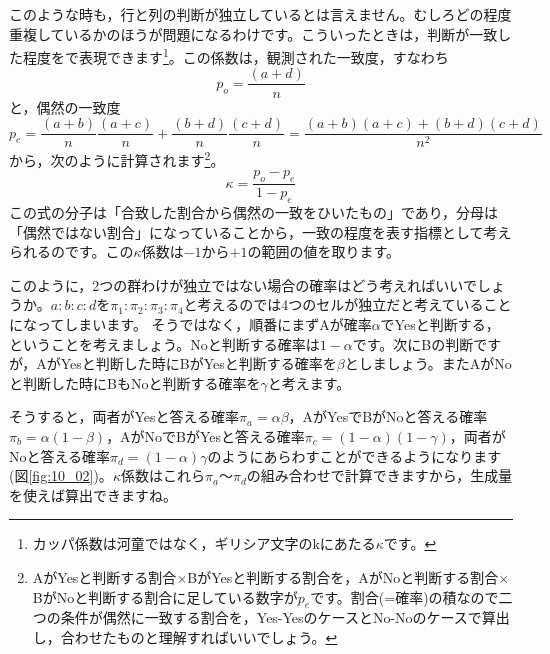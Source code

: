 \documentclass{ltjsbook}
\begin{document}
このような時も，行と列の判断が独立しているとは言えません。むしろどの程度重複しているかのほうが問題になるわけです。こういったときは，判断が一致した程度をで表現できます\footnote{カッパ係数は河童ではなく，ギリシア文字のkにあたる$\kappa$です。}。この係数は，観測された一致度，すなわち
\[ p_o = \frac{( a + d )}{n} \]
と，偶然の一致度
\[ p_e = \frac{(a+b)}{n}\frac{(a+c)}{n} + \frac{(b+d)}{n}\frac{(c+d)}{n} = \frac{(a+b)(a+c)+(b+d)(c+d)}{n^2} \]
から，次のように計算されます\footnote{AがYesと判断する割合$\times$BがYesと判断する割合を，AがNoと判断する割合$\times$BがNoと判断する割合に足している数字が$p_e$です。割合(=確率)の積なので二つの条件が偶然に一致する割合を，Yes-YesのケースとNo-Noのケースで算出し，合わせたものと理解すればいいでしょう。}。
\[ \kappa = \frac{p_o-p_e}{1-p_e } \]
この式の分子は「合致した割合から偶然の一致をひいたもの」であり，分母は「偶然ではない割合」になっていることから，一致の程度を表す指標として考えられるのです。この$\kappa$係数は$-1$から$+1$の範囲の値を取ります。


このように，2つの群わけが独立ではない場合の確率はどう考えればいいでしょうか。$a:b:c:d$を$\pi_1:\pi_2:\pi_3:\pi_4$と考えるのでは4つのセルが独立だと考えていることになってしまいます。
そうではなく，順番にまずAが確率$\alpha$でYesと判断する，ということを考えましょう。Noと判断する確率は$1-\alpha$です。次にBの判断ですが，AがYesと判断した時にBがYesと判断する確率を$\beta$としましょう。またAがNoと判断した時にBもNoと判断する確率を$\gamma$と考えます。

そうすると，両者がYesと答える確率$\pi_a = \alpha\beta$，AがYesでBがNoと答える確率$\pi_b = \alpha(1-\beta)$，AがNoでBがYesと答える確率$\pi_c = (1-\alpha)(1-\gamma)$，両者がNoと答える確率$\pi_d = (1-\alpha)\gamma $のようにあらわすことができるようになります(図\ref{fig:10_02})。$\kappa$係数はこれら$\pi_a$〜$\pi_d$の組み合わせで計算できますから，生成量を使えば算出できますね。
\end{document}
